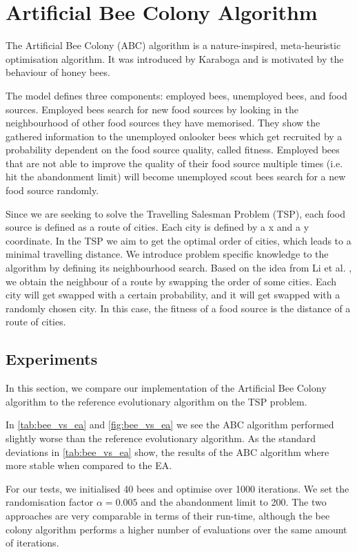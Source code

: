\section{Artificial Bee Colony Algorithm}

The Artificial Bee Colony (ABC) algorithm is a nature-inspired, meta-heuristic optimisation
algorithm. It was introduced by Karaboga \cite{beecolony} and is motivated by the behaviour of honey bees.

The model defines three components: employed bees, unemployed bees, and food sources. Employed bees search for new food sources by looking in the neighbourhood of other food sources they have memorised. They show the gathered information to the unemployed onlooker bees which get recruited by a probability dependent on the food source quality, called fitness. Employed bees that are not able to improve the quality of their food source multiple times (i.e. hit the abandonment limit) will become unemployed scout bees search for a new food source randomly.

Since we are seeking to solve the Travelling Salesman Problem (TSP), each food source is defined as a route of cities. Each city is defined by a x and a y coordinate. In the TSP we aim to get the optimal order of cities, which leads to a minimal travelling distance. We introduce problem specific knowledge to the algorithm by defining its neighbourhood search. Based on the idea from Li et al. \cite{beetsp}, we obtain the neighbour of a route by swapping the order of some cities. Each city will get swapped with a certain probability, and it will get swapped with a randomly chosen city. In this case, the fitness of a food source is the distance of a route of cities.

\subsection{Experiments}

In this section, we compare our implementation of the Artificial Bee Colony algorithm to the
reference evolutionary algorithm on the TSP problem.

In \cref{tab:bee_vs_ea} and \cref{fig:bee_vs_ea} we see the ABC algorithm performed slightly worse than the reference evolutionary algorithm. As the standard deviations in \cref{tab:bee_vs_ea} show, the results of the ABC algorithm where more stable when compared to the EA.

For our tests, we initialised 40 bees and optimise over 1000 iterations. We set the randomisation factor $\alpha = 0.005$ and the abandonment limit to 200.
The two approaches are very comparable in terms of their run-time, although the bee colony algorithm performs a higher number of evaluations over the same amount of iterations.

